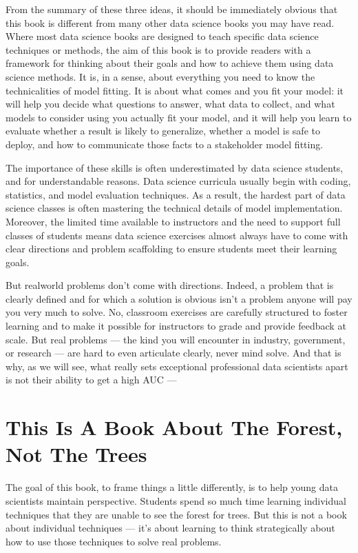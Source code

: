 \documentclass[letterpaper,10pt,english]{jupyterBook}
\begin{document}
\sphinxAtStartPar
From the summary of these three ideas, it should be immediately obvious that this book is different from many other data science books you may have read. Where most data science books are designed to teach specific data science techniques or methods, the aim of this book is to provide readers with a framework for thinking about their goals and how to achieve them using data science methods. It is, in a sense, about everything you need to know  the technicalities of model fitting. It is about what comes  and  you fit your model: it will help you decide what questions to answer, what data to collect, and what models to consider using  you actually fit your model, and it will help you learn to evaluate whether a result is likely to generalize, whether a model is safe to deploy, and how to communicate those facts to a stakeholder  model fitting.

\sphinxAtStartPar
The importance of these skills is often underestimated by data science students, and for understandable reasons. Data science curricula usually begin with coding, statistics, and model evaluation techniques. As a result, the hardest part of data science classes is often mastering the technical details of model implementation. Moreover, the limited time available to instructors and the need to support full classes of students means data science exercises almost always have to come with clear directions and problem scaffolding to ensure students meet their learning goals.

\sphinxAtStartPar
But real\sphinxhyphen{}world problems don’t come with directions. Indeed, a problem that is clearly defined and for which a solution is obvious isn’t a problem anyone will pay you very much to solve. No, classroom exercises are carefully structured to foster learning and to make it possible for instructors to grade and provide feedback at scale. But real problems — the kind you will encounter in industry, government, or research — are hard to even articulate clearly, never mind solve. And that is why, as we will see, what really sets exceptional professional data scientists apart is not their ability to get a high AUC — 


\section{This Is A Book About The Forest, Not The Trees}
\label{\detokenize{10_introduction/10_solving_problems_with_data:this-is-a-book-about-the-forest-not-the-trees}}
\sphinxAtStartPar
The goal of this book, to frame things a little differently, is to help young data scientists maintain perspective. Students spend so much time learning individual techniques that they are unable to see the forest for trees. But this is not a book about individual techniques — it’s about learning to think strategically about how to use those techniques to solve real problems.
\end{document}
